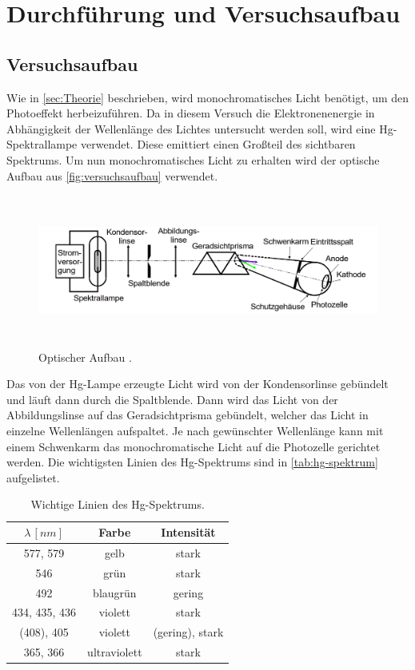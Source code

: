 \section{Durchführung und Versuchsaufbau}
\label{sec:Durchführung}

\subsection{Versuchsaufbau}
Wie in \autoref{sec:Theorie} beschrieben, wird monochromatisches Licht benötigt, um den Photoeffekt herbeizuführen. Da in diesem Versuch die Elektronenenergie in Abhängigkeit 
der Wellenlänge des Lichtes untersucht werden soll, wird eine Hg-Spektrallampe verwendet. Diese emittiert einen Großteil des sichtbaren Spektrums.
Um nun monochromatisches Licht zu erhalten wird der optische Aufbau aus \autoref{fig:versuchsaufbau} verwendet. 

\begin{figure}[H]
    \centering
    \includegraphics[width=1\textwidth, height = 5cm]{img/versuchsaufbau.png}
    \caption{Optischer Aufbau \cite{V500}.}
    \label{fig:versuchsaufbau}
\end{figure}

Das von der Hg-Lampe erzeugte Licht wird von der Kondensorlinse gebündelt und läuft dann durch die Spaltblende. Dann wird das Licht von der Abbildungslinse auf das 
Geradsichtprisma gebündelt, welcher das Licht in einzelne Wellenlängen aufspaltet. Je nach gewünschter Wellenlänge kann mit einem Schwenkarm das monochromatische Licht
auf die Photozelle gerichtet werden. 
Die wichtigsten Linien des Hg-Spektrums sind in \autoref{tab:hg-spektrum} aufgelistet.

\begin{table}[H]
    \centering
    \caption{Wichtige Linien des Hg-Spektrums.}
    \begin{tabular}{c c c}
        \toprule
        $\lambda \,[\unit{nm}]$ & Farbe & Intensität\\
        \midrule
        577, 579 & gelb & stark\\
        546 & grün & stark\\
        492 & blaugrün & gering\\
        434, 435, 436 & violett & stark\\
        (408), 405 & violett & (gering), stark\\
        365, 366 & ultraviolett & stark\\
        \bottomrule
    \end{tabular}
    \label{tab:hg-spektrum}
\end{table}

